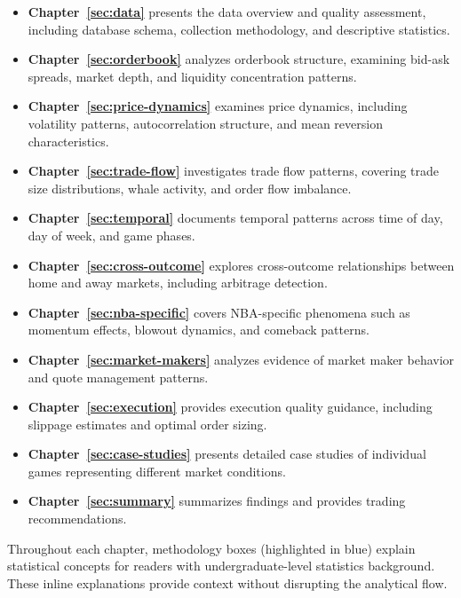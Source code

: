 \begin{itemize}
    \item \textbf{Chapter~\ref{sec:data}} presents the data overview and quality assessment, including database schema, collection methodology, and descriptive statistics.

    \item \textbf{Chapter~\ref{sec:orderbook}} analyzes orderbook structure, examining bid-ask spreads, market depth, and liquidity concentration patterns.

    \item \textbf{Chapter~\ref{sec:price-dynamics}} examines price dynamics, including volatility patterns, autocorrelation structure, and mean reversion characteristics.

    \item \textbf{Chapter~\ref{sec:trade-flow}} investigates trade flow patterns, covering trade size distributions, whale activity, and order flow imbalance.

    \item \textbf{Chapter~\ref{sec:temporal}} documents temporal patterns across time of day, day of week, and game phases.

    \item \textbf{Chapter~\ref{sec:cross-outcome}} explores cross-outcome relationships between home and away markets, including arbitrage detection.

    \item \textbf{Chapter~\ref{sec:nba-specific}} covers NBA-specific phenomena such as momentum effects, blowout dynamics, and comeback patterns.

    \item \textbf{Chapter~\ref{sec:market-makers}} analyzes evidence of market maker behavior and quote management patterns.

    \item \textbf{Chapter~\ref{sec:execution}} provides execution quality guidance, including slippage estimates and optimal order sizing.

    \item \textbf{Chapter~\ref{sec:case-studies}} presents detailed case studies of individual games representing different market conditions.

    \item \textbf{Chapter~\ref{sec:summary}} summarizes findings and provides trading recommendations.
\end{itemize}

Throughout each chapter, methodology boxes (highlighted in blue) explain statistical concepts for readers with undergraduate-level statistics background. These inline explanations provide context without disrupting the analytical flow.

